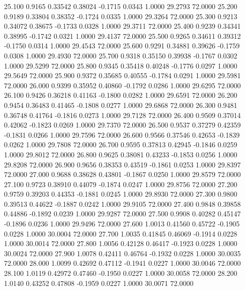   25.100   0.9165   0.33542   0.38024  -0.1715   0.0343   1.0000  29.2793  72.0000
  25.200   0.9189   0.33804   0.38352  -0.1724   0.0335   1.0000  29.3264  72.0000
  25.300   0.9213   0.34072   0.38675  -0.1733   0.0328   1.0000  29.3711  72.0000
  25.400   0.9239   0.34341   0.38995  -0.1742   0.0321   1.0000  29.4137  72.0000
  25.500   0.9265   0.34611   0.39312  -0.1750   0.0314   1.0000  29.4543  72.0000
  25.600   0.9291   0.34881   0.39626  -0.1759   0.0308   1.0000  29.4930  72.0000
  25.700   0.9318   0.35150   0.39938  -0.1767   0.0302   1.0000  29.5299  72.0000
  25.800   0.9345   0.35418   0.40248  -0.1776   0.0297   1.0000  29.5649  72.0000
  25.900   0.9372   0.35685   0.40555  -0.1784   0.0291   1.0000  29.5981  72.0000
  26.000   0.9399   0.35952   0.40860  -0.1792   0.0286   1.0000  29.6295  72.0000
  26.100   0.9426   0.36218   0.41163  -0.1800   0.0282   1.0000  29.6591  72.0000
  26.200   0.9454   0.36483   0.41465  -0.1808   0.0277   1.0000  29.6868  72.0000
  26.300   0.9481   0.36748   0.41764  -0.1816   0.0273   1.0000  29.7128  72.0000
  26.400   0.9509   0.37014   0.42062  -0.1823   0.0269   1.0000  29.7370  72.0000
  26.500   0.9537   0.37279   0.42359  -0.1831   0.0266   1.0000  29.7596  72.0000
  26.600   0.9566   0.37546   0.42653  -0.1839   0.0262   1.0000  29.7808  72.0000
  26.700   0.9595   0.37813   0.42945  -0.1846   0.0259   1.0000  29.8012  72.0000
  26.800   0.9625   0.38081   0.43233  -0.1853   0.0256   1.0000  29.8208  72.0000
  26.900   0.9656   0.38353   0.43519  -0.1861   0.0253   1.0000  29.8397  72.0000
  27.000   0.9688   0.38628   0.43801  -0.1867   0.0250   1.0000  29.8579  72.0000
  27.100   0.9723   0.38910   0.44079  -0.1874   0.0247   1.0000  29.8756  72.0000
  27.200   0.9759   0.39203   0.44353  -0.1881   0.0245   1.0000  29.8930  72.0000
  27.300   0.9800   0.39513   0.44622  -0.1887   0.0242   1.0000  29.9105  72.0000
  27.400   0.9848   0.39858   0.44886  -0.1892   0.0239   1.0000  29.9287  72.0000
  27.500   0.9908   0.40282   0.45147  -0.1896   0.0236   1.0000  29.9496  72.0000
  27.600   1.0013   0.41560   0.45722  -0.1905   0.0228   1.0000  30.0004  72.0000
  27.700   1.0035   0.41845   0.46069  -0.1914   0.0228   1.0000  30.0014  72.0000
  27.800   1.0056   0.42128   0.46417  -0.1923   0.0228   1.0000  30.0024  72.0000
  27.900   1.0078   0.42411   0.46764  -0.1932   0.0228   1.0000  30.0035  72.0000
  28.000   1.0099   0.42692   0.47112  -0.1941   0.0227   1.0000  30.0046  72.0000
  28.100   1.0119   0.42972   0.47460  -0.1950   0.0227   1.0000  30.0058  72.0000
  28.200   1.0140   0.43252   0.47808  -0.1959   0.0227   1.0000  30.0071  72.0000
